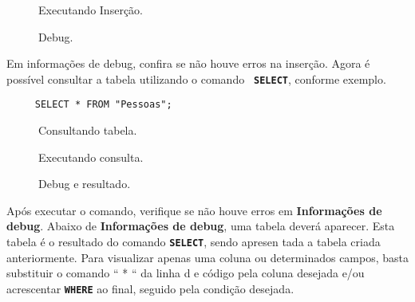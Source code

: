 \documentclass[9pt]{report}
\begin{document}
{   \begin{figure}[H]
      \caption{Executando Inserção.}
      \label{fig:executarIn}
   \end{figure}

   \begin{figure}[H]
     \caption{Debug.}
     \label{fig:debugInsercao}
   \end{figure}

   Em informações de debug, confira se não houve erros na inserção.
   Agora é possível consultar a tabela utilizando o comando
   \texttt{\textbf{ SELECT}}, conforme exemplo.
   \\
   \begin{lstlisting}
     SELECT * FROM "Pessoas";
   \end{lstlisting}
  
  \begin{figure}[H]
     \caption{Consultando tabela.}
     \label{fig:select1}
   \end{figure}

   \begin{figure}[H]
     \caption{Executando consulta.}
     \label{fig:execons}
   \end{figure}

    \begin{figure}[H]
     \caption{Debug e resultado.}
     \label{fig:select2}
    \end{figure}

    Após executar o comando, verifique se não houve erros em
    \textbf{Informações de debug}. Abaixo de \textbf{Informações de
     debug}, uma tabela deverá aparecer. Esta tabela é o resultado do
    comando \texttt{\textbf{SELECT}}, sendo apresen tada a tabela
    criada anteriormente. Para visualizar apenas uma coluna ou
    determinados campos, basta substituir o comando “ * “ da linha d
    e código pela coluna desejada e/ou acrescentar
    \texttt{\textbf{WHERE}} ao final, seguido pela condição desejada.
    
}
\end{document}

